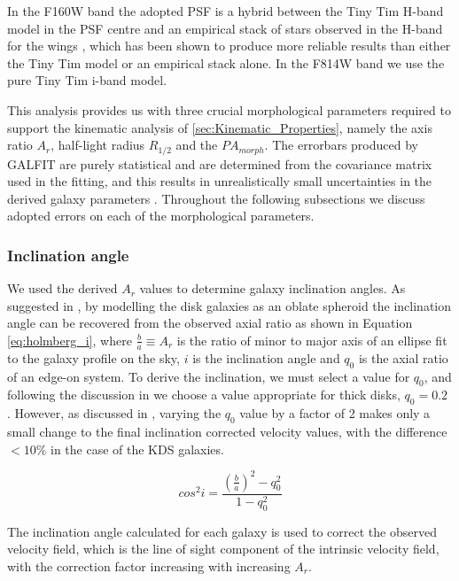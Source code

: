 \documentclass[fleqn,usenatbib]{mn2e}
\begin{document}
In the F160W band the adopted PSF is a hybrid between the Tiny Tim H-band model \citep{Krist2011} in the PSF centre and an empirical stack of stars observed in the H-band for the wings \citep{VanderWel2012}, which has been shown to produce more reliable results than either the Tiny Tim model or an empirical stack alone.
In the F814W band we use the pure Tiny Tim i-band model.

This analysis provides us with three crucial morphological parameters required to support the kinematic analysis of \cref{sec:Kinematic_Properties}, namely the axis ratio $A_{r}$, half-light radius $R_{1/2}$ and the $PA_{morph}$. The errorbars produced by GALFIT are purely statistical and are determined from the covariance matrix used in the fitting, and this results in unrealistically small uncertainties in the derived galaxy parameters \citep{Hausler2007,Bruce2012}.
Throughout the following subsections we discuss adopted errors on each of the morphological parameters.

\subsubsection{Inclination angle}\label{subsubsection:inclination_angle}
We used the derived $A_{r}$ values to determine galaxy inclination angles.
As suggested in \cite{Holmberg1958}, by modelling the disk galaxies as an oblate spheroid the inclination angle can be recovered from the observed axial ratio as shown in Equation \ref{eq:holmberg_i}, where $\frac{b}{a} \equiv A_{r}$ is the ratio of minor to major axis of an ellipse fit to the galaxy profile on the sky, $i$ is the inclination angle and $q_{0}$ is the axial ratio of an edge-on system.
To derive the inclination, we must select a value for $q_{0}$, and following the discussion in \citep{Law2012a} we choose a value appropriate for thick disks, $q_{0} = 0.2$ \citep[e.g.][]{Epinat2012,Harrison2017}.
However, as discussed in \cite{Harrison2017}, varying the $q_{0}$ value by a factor of 2 makes only a small change to the final inclination corrected velocity values, with the difference $<10\%$ in the case of the KDS galaxies.

\begin{equation}\label{eq:holmberg_i}
   cos^{2}i = \frac{\left(\frac{b}{a}\right)^{2} - q_{0}^{2}}{1 - q_{0}^{2}}
\end{equation}

The inclination angle calculated for each galaxy is used to correct the observed velocity field, which is the line of sight component of the intrinsic velocity field, with the correction factor increasing with increasing $A_{r}$.
\end{document}
